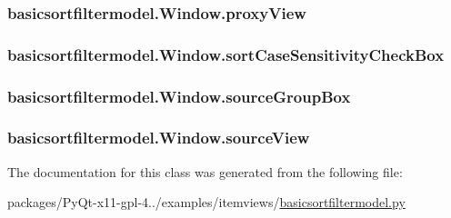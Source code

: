 \subsubsection[{proxy\+View}]{\setlength{\rightskip}{0pt plus 5cm}basicsortfiltermodel.\+Window.\+proxy\+View}\label{classbasicsortfiltermodel_1_1Window_aa589d23b7646e38846688d5fd2037a8a}
\hypertarget{classbasicsortfiltermodel_1_1Window_a8e6c890d88c689bf0d992640af605a98}{}
\subsubsection[{sort\+Case\+Sensitivity\+Check\+Box}]{\setlength{\rightskip}{0pt plus 5cm}basicsortfiltermodel.\+Window.\+sort\+Case\+Sensitivity\+Check\+Box}\label{classbasicsortfiltermodel_1_1Window_a8e6c890d88c689bf0d992640af605a98}
\hypertarget{classbasicsortfiltermodel_1_1Window_a17100bfc729f757cb541fd4f87a61c34}{}
\subsubsection[{source\+Group\+Box}]{\setlength{\rightskip}{0pt plus 5cm}basicsortfiltermodel.\+Window.\+source\+Group\+Box}\label{classbasicsortfiltermodel_1_1Window_a17100bfc729f757cb541fd4f87a61c34}
\hypertarget{classbasicsortfiltermodel_1_1Window_ac87ebb8c75b2492149fbab135a1c73ff}{}
\subsubsection[{source\+View}]{\setlength{\rightskip}{0pt plus 5cm}basicsortfiltermodel.\+Window.\+source\+View}\label{classbasicsortfiltermodel_1_1Window_ac87ebb8c75b2492149fbab135a1c73ff}


The documentation for this class was generated from the following file\+:\begin{DoxyCompactItemize}
\item 
packages/\+Py\+Qt-\/x11-\/gpl-\/4../examples/itemviews/\hyperlink{basicsortfiltermodel_8py}{basicsortfiltermodel.\+py}\end{DoxyCompactItemize}
